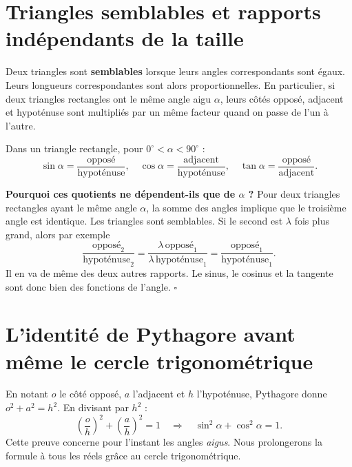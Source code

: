 \documentclass[../cours_spe_trigo.tex]{subfiles}
\begin{document}
\section{Triangles semblables et rapports indépendants de la taille}
Deux triangles sont \textbf{semblables} lorsque leurs angles correspondants sont égaux. Leurs longueurs correspondantes sont alors proportionnelles. En particulier, si deux triangles rectangles ont le même angle aigu $\alpha$, leurs côtés opposé, adjacent et hypoténuse sont multipliés par un même facteur quand on passe de l'un à l'autre.
\begin{definition}
Dans un triangle rectangle, pour $0^\circ<\alpha<90^\circ$ :
\[
\boxed{\sin\alpha=\frac{\text{opposé}}{\text{hypoténuse}},\quad
\cos\alpha=\frac{\text{adjacent}}{\text{hypoténuse}},\quad
\tan\alpha=\frac{\text{opposé}}{\text{adjacent}}.}
\]
\end{definition}
\begin{demonstration}
\textbf{Pourquoi ces quotients ne dépendent-ils que de $\alpha$ ?} Pour deux triangles rectangles ayant le même angle $\alpha$, la somme des angles implique que le troisième angle est identique. Les triangles sont semblables. Si le second est $\lambda$ fois plus grand, alors par exemple
\[
\frac{\text{opposé}_2}{\text{hypoténuse}_2}
=\frac{\lambda\,\text{opposé}_1}{\lambda\,\text{hypoténuse}_1}
=\frac{\text{opposé}_1}{\text{hypoténuse}_1}.
\]
Il en va de même des deux autres rapports. Le sinus, le cosinus et la tangente sont donc bien des fonctions de l'angle. $\square$
\end{demonstration}
\begin{center}
\end{center}
\section{L'identité de Pythagore avant même le cercle trigonométrique}
En notant $o$ le côté opposé, $a$ l'adjacent et $h$ l'hypoténuse, Pythagore donne $o^2+a^2=h^2$. En divisant par $h^2$ :
\[
\left(\frac{o}{h}\right)^2+\left(\frac{a}{h}\right)^2=1
\quad\Longrightarrow\quad\boxed{\sin^2\alpha+\cos^2\alpha=1}.
\]
Cette preuve concerne pour l'instant les angles \emph{aigus}. Nous prolongerons la formule à tous les réels grâce au cercle trigonométrique.
\end{document}
